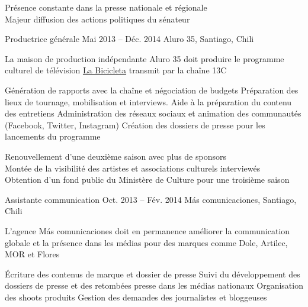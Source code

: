 \begin{joblist}
{		 Présence constante dans la presse nationale et régionale  \\
		\mission{}            Majeur diffusion des actions politiques du sénateur
	}
    
    
    
\item[Productrice générale]{Mai 2013 -- Déc. 2014}
     {Aluro 35, Santiago, Chili}
	 {	
		 La maison de production indépendante Aluro 35 doit produire le programme culturel de télévision \href{http://www.13.cl/c/programas/la-bicicleta}{La Bicicleta} transmit par la chaîne 13C \\
			
			\iftbftiny \setlength{\parskip}{-10pt} \fi
			\begin{itemize}
			  \iftbftiny \setlength\itemsep{-3pt} \fi
			  \cvitem[\checkmark] Génération de rapports avec la chaîne et négociation de budgets                       
			  \cvitem[\checkmark] Préparation des lieux de tournage, mobilisation et interviews. Aide à la préparation du contenu des entretiens 
			  \cvitem[\checkmark] Administration des réseaux sociaux et animation des communautés (Facebook, Twitter, Instagram)                 
			  \cvitem[\checkmark] Création des dossiers de presse pour les lancements du programme                                             
			\end{itemize}     
			
		 Renouvellement d'une deuxième saison avec plus de sponsors \\
		\mission{}	     Montée de la visibilité des artistes et associations culturels interviewés \\
		\mission{}           Obtention d’un fond public du Ministère de Culture pour une troisième saison 
	}



\item[Assistante communication]{Oct. 2013 -- Fév. 2014 }     
  	{Más comunicaciones, Santiago, Chili}     
  	{
		 L’agence Más comunicaciones doit en permanence améliorer la communication globale et la présence dans les médias
		pour des marques comme Dole, Artilec, MOR et Flores\\
		\mission{Missions :}

		\iftbftiny \setlength{\parskip}{-10pt} \fi
		\begin{itemize}
			  \iftbftiny \setlength\itemsep{-3pt} \fi
			  \cvitem[\checkmark]  Écriture des contenus de marque et dossier de presse                                        
			  \cvitem[\checkmark]  Suivi du développement des dossiers de presse et des retombées presse dans les médias nationaux                                             
			  \cvitem[\checkmark]  Organisation des shoots produits 
			  \cvitem[\checkmark]  Gestion des demandes des journalistes et bloggeuses 


\end{itemize}}
\end{joblist}
